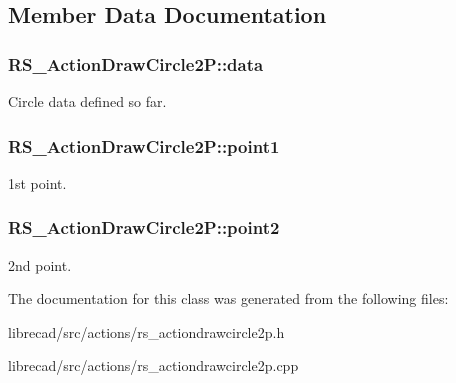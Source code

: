 \subsection{Member Data Documentation}
\hypertarget{classRS__ActionDrawCircle2P_af95bc65a82656e4e5d740e9f8e9abd41}{
\subsubsection[{data}]{ R\-S\-\_\-\-Action\-Draw\-Circle2\-P\-::data\hspace{0.3cm}{\ttfamily [protected]}}}\label{classRS__ActionDrawCircle2P_af95bc65a82656e4e5d740e9f8e9abd41}
Circle data defined so far. \hypertarget{classRS__ActionDrawCircle2P_a111a559b7dd5946befd13893a5beb630}{
\subsubsection[{point1}]{ R\-S\-\_\-\-Action\-Draw\-Circle2\-P\-::point1\hspace{0.3cm}{\ttfamily [protected]}}}\label{classRS__ActionDrawCircle2P_a111a559b7dd5946befd13893a5beb630}
1st point. \hypertarget{classRS__ActionDrawCircle2P_a3497d07cd675dcdf3aad478f973a2cca}{
\subsubsection[{point2}]{ R\-S\-\_\-\-Action\-Draw\-Circle2\-P\-::point2\hspace{0.3cm}{\ttfamily [protected]}}}\label{classRS__ActionDrawCircle2P_a3497d07cd675dcdf3aad478f973a2cca}
2nd point. 

The documentation for this class was generated from the following files\-:\begin{DoxyCompactItemize}
\item 
librecad/src/actions/rs\-\_\-actiondrawcircle2p.\-h\item 
librecad/src/actions/rs\-\_\-actiondrawcircle2p.\-cpp\end{DoxyCompactItemize}

